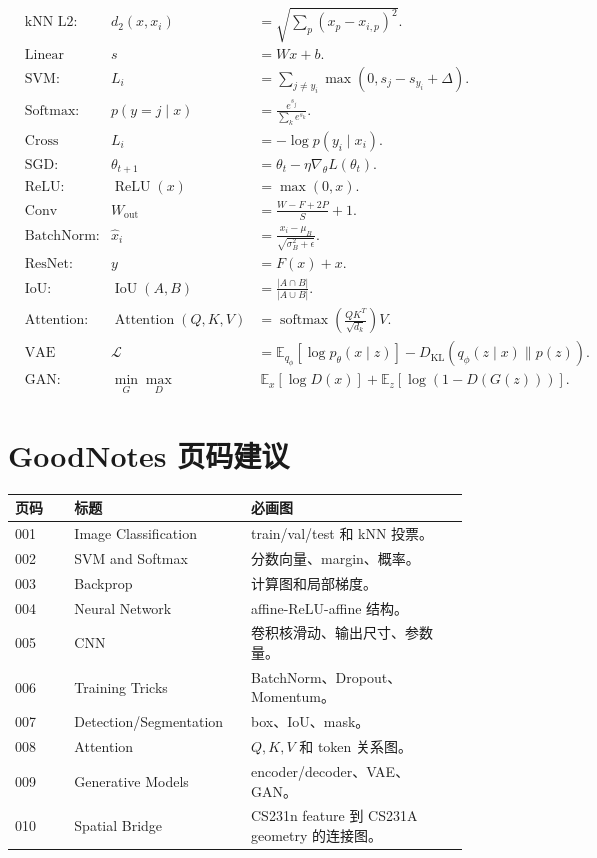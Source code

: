 \documentclass[11pt]{article}
\newcommand{\softmax}{\operatorname{softmax}}
\newcommand{\ReLU}{\operatorname{ReLU}}
\newcommand{\E}{\mathbb{E}}
\newcommand{\KL}{D_{\mathrm{KL}}}
\begin{document}
\begin{align*}
  &\text{kNN L2:} &
  d_2(x,x_i)&=\sqrt{\sum_p(x_p-x_{i,p})^2}.\\
  &\text{Linear classifier:} &
  s&=Wx+b.\\
  &\text{SVM:} &
  L_i&=\sum_{j\neq y_i}\max(0,s_j-s_{y_i}+\Delta).\\
  &\text{Softmax:} &
  p(y=j\mid x)&=\frac{e^{s_j}}{\sum_k e^{s_k}}.\\
  &\text{Cross entropy:} &
  L_i&=-\log p(y_i\mid x_i).\\
  &\text{SGD:} &
  \theta_{t+1}&=\theta_t-\eta\nabla_\theta L(\theta_t).\\
  &\text{ReLU:} &
  \ReLU(x)&=\max(0,x).\\
  &\text{Conv output:} &
  W_{\text{out}}&=\frac{W-F+2P}{S}+1.\\
  &\text{BatchNorm:} &
  \hat x_i&=\frac{x_i-\mu_B}{\sqrt{\sigma_B^2+\epsilon}}.\\
  &\text{ResNet:} &
  y&=F(x)+x.\\
  &\text{IoU:} &
  \operatorname{IoU}(A,B)&=\frac{|A\cap B|}{|A\cup B|}.\\
  &\text{Attention:} &
  \operatorname{Attention}(Q,K,V)&=\softmax\left(\frac{QK^T}{\sqrt{d_k}}\right)V.\\
  &\text{VAE ELBO:} &
  \mathcal L&=\E_{q_\phi}[\log p_\theta(x\mid z)]-\KL(q_\phi(z\mid x)\|p(z)).\\
  &\text{GAN:} &
  \min_G\max_D&\ \E_x[\log D(x)]+\E_z[\log(1-D(G(z)))].
\end{align*}

\section*{GoodNotes 页码建议}

\begin{center}
\begin{tabular}{p{0.12\linewidth}p{0.34\linewidth}p{0.44\linewidth}}
\toprule
页码 & 标题 & 必画图 \\
\midrule
001 & Image Classification & train/val/test 和 kNN 投票。 \\
002 & SVM and Softmax & 分数向量、margin、概率。 \\
003 & Backprop & 计算图和局部梯度。 \\
004 & Neural Network & affine-ReLU-affine 结构。 \\
005 & CNN & 卷积核滑动、输出尺寸、参数量。 \\
006 & Training Tricks & BatchNorm、Dropout、Momentum。 \\
007 & Detection/Segmentation & box、IoU、mask。 \\
008 & Attention & $Q,K,V$ 和 token 关系图。 \\
009 & Generative Models & encoder/decoder、VAE、GAN。 \\
010 & Spatial Bridge & CS231n feature 到 CS231A geometry 的连接图。 \\
\bottomrule
\end{tabular}
\end{center}
\end{document}
